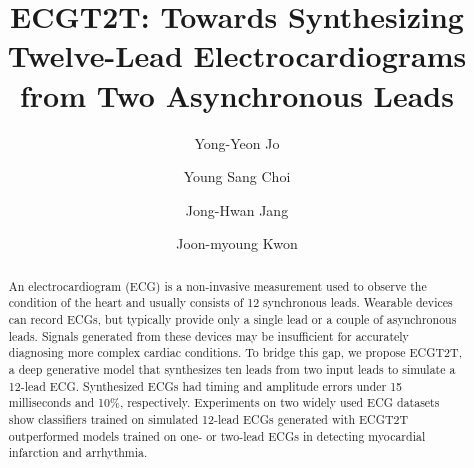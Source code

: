 \documentclass[sigconf]{acmart}
\begin{document}
\title{ECGT2T: Towards Synthesizing Twelve-Lead Electrocardiograms from Two Asynchronous Leads}

\author{Yong-Yeon Jo}
\author{Young Sang Choi}


\author{ Jong-Hwan Jang}

\author{Joon-myoung Kwon}


\begin{abstract}
An electrocardiogram (ECG) is a non-invasive measurement used to observe the condition of the heart and usually consists of 12 synchronous leads. Wearable devices can record ECGs, but typically provide only a single lead or a couple of asynchronous leads. Signals generated from these devices may be insufficient for accurately diagnosing more complex cardiac conditions.
To bridge this gap, we propose \textsf{ECGT2T}, a deep generative model that synthesizes ten leads from two input leads to simulate a 12-lead ECG. 
Synthesized ECGs had timing and amplitude errors under 15 milliseconds and 10\%, respectively. 
Experiments on two widely used ECG datasets show classifiers trained on simulated 12-lead ECGs generated with ECGT2T outperformed models trained on one- or two-lead ECGs in detecting myocardial infarction and arrhythmia.
\end{abstract}
\end{document}
